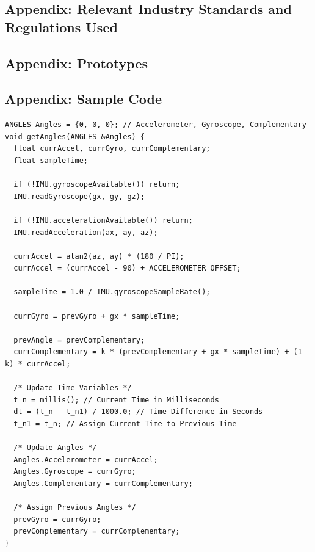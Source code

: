\documentclass{article}
\begin{document}
\subsection{Appendix: Relevant Industry Standards and Regulations Used}

\subsection{Appendix: Prototypes}

\subsection{Appendix: Sample Code}

\begin{lstlisting}[caption={Arduino IMU Complementary Filter Firmware Implementation}, label={lst:arduino_angle_code}]
ANGLES Angles = {0, 0, 0}; // Accelerometer, Gyroscope, Complementary
void getAngles(ANGLES &Angles) {
  float currAccel, currGyro, currComplementary;
  float sampleTime;

  if (!IMU.gyroscopeAvailable()) return;
  IMU.readGyroscope(gx, gy, gz);

  if (!IMU.accelerationAvailable()) return;
  IMU.readAcceleration(ax, ay, az);

  currAccel = atan2(az, ay) * (180 / PI);
  currAccel = (currAccel - 90) + ACCELEROMETER_OFFSET;

  sampleTime = 1.0 / IMU.gyroscopeSampleRate();

  currGyro = prevGyro + gx * sampleTime;

  prevAngle = prevComplementary;
  currComplementary = k * (prevComplementary + gx * sampleTime) + (1 - k) * currAccel;

  /* Update Time Variables */
  t_n = millis(); // Current Time in Milliseconds
  dt = (t_n - t_n1) / 1000.0; // Time Difference in Seconds
  t_n1 = t_n; // Assign Current Time to Previous Time

  /* Update Angles */
  Angles.Accelerometer = currAccel;
  Angles.Gyroscope = currGyro;
  Angles.Complementary = currComplementary;

  /* Assign Previous Angles */
  prevGyro = currGyro;
  prevComplementary = currComplementary;
}
\end{lstlisting}
\end{document}
